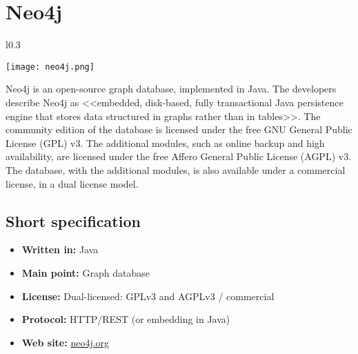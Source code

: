 \chapter{Neo4j}

\begin{wrapfigure}{l}{0.3\textwidth}
  \vspace{-75pt}
  \begin{center}
    \texttt{[image: neo4j.png]}
  \end{center}
  \vspace{-30pt}
\end{wrapfigure}
Neo4j is an open-source graph database, implemented in Java. The developers describe Neo4j as <<embedded, disk-based, fully transactional Java persistence engine that stores data structured in graphs rather than in tables>>. The community edition of the database is licensed under the free GNU General Public License (GPL) v3. The additional modules, such as online backup and high availability, are licensed under the free Affero General Public License (AGPL) v3. The database, with the additional modules, is also available under a commercial license, in a dual license model.

\section{Short specification}

\begin{itemize}
  \item \textbf{Written in:} Java
  \item \textbf{Main point:} Graph database
  \item \textbf{License:} Dual-licensed: GPLv3 and AGPLv3 / commercial
  \item \textbf{Protocol:} HTTP/REST (or embedding in Java)
  \item \textbf{Web site:} \href{http://neo4j.org/}{neo4j.org}
\end{itemize}